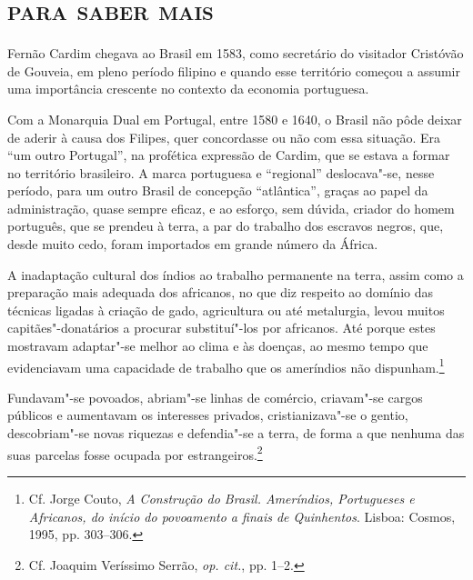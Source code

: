 \part{\textsc{para saber mais}}



Fernão Cardim chegava ao Brasil em 1583, como secretário do visitador
Cristóvão de Gouveia, em pleno período filipino e quando esse território 
começou a assumir uma importância crescente no contexto da economia portuguesa. 

Com a Monarquia Dual em Portugal, entre 1580 e 1640, o Brasil não
pôde deixar de aderir à causa dos Filipes, quer concordasse ou não com
essa situação. Era ``um outro Portugal'', na profética expressão
de Cardim, que se estava a formar no território brasileiro. A marca
portuguesa e ``regional'' deslocava"-se, nesse período, para um outro
Brasil de concepção ``atlântica'', graças ao papel da administração,
quase sempre eficaz, e ao esforço, sem dúvida, criador do homem
português, que se prendeu à terra, a par do trabalho dos escravos
negros, que, desde muito cedo, foram importados em grande número da África.

 A inadaptação cultural dos índios ao trabalho permanente na terra,
assim como a preparação mais adequada dos africanos, no que diz
respeito ao domínio das técnicas ligadas à criação de gado, agricultura
ou até metalurgia, levou muitos capitães"-donatários a procurar
substituí"-los por africanos. Até porque estes mostravam adaptar"-se
melhor ao clima e às doenças, ao mesmo tempo que evidenciavam uma
capacidade de trabalho que os ameríndios não dispunham.\footnote{ Cf. 
Jorge Couto, \textit{A Construção do Brasil. Ameríndios,
Portugueses e Africanos, do início do povoamento a finais de
Quinhentos}. Lisboa: Cosmos, 1995, pp. 303--306.}

 Fundavam"-se povoados, abriam"-se linhas de comércio, criavam"-se
cargos públicos e aumentavam os interesses privados, cristianizava"-se o
gentio, descobriam"-se novas riquezas e defendia"-se a terra, de forma a
que nenhuma das suas parcelas fosse ocupada por estrangeiros.\footnote{ Cf. Joaquim 
Veríssimo Serrão, \textit{op. cit.}, pp. 1--2.}

